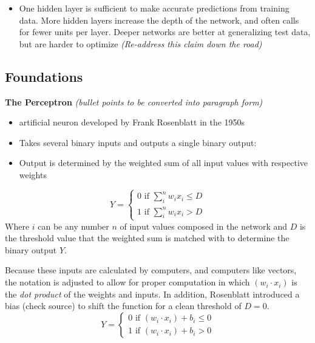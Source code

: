 \begin{itemize}
\tightlist
  
\item
  One hidden layer is sufficient to make accurate predictions from
  training data. More hidden layers increase the depth of the network,
  and often calls for fewer units per layer. Deeper networks are better
  at generalizing test data, but are harder to optimize
  \cite{Goodfellow-et-al-2016} \emph{(Re-address this claim down the
  road)}
\end{itemize}

\hypertarget{foundations}{%
\subsection{Foundations}\label{foundations}}

\textbf{The Perceptron} \textit{(bullet points to be converted into paragraph form)}

\begin{itemize}
\tightlist
\item
  artificial neuron developed by Frank Rosenblatt in the 1950s
  \cite{nielsen}
\item
  Takes several binary inputs and outputs a single binary output:
\item
  Output is determined by the weighted sum of all input values with
  respective weights
\end{itemize}

\[
Y = 
\begin{cases}
0 \text{ if } \sum_i^n w_ix_i \le D \\
1 \text{ if } \sum_i^n w_ix_i > D
\end{cases}
\] Where \(i\) can be any number \(n\) of input values composed in the
network and \(D\) is the threshold value that the weighted sum is
matched with to determine the binary output \(Y\).

Because these inputs are calculated by computers, and computers like
vectors, the notation is adjusted to allow for proper computation in which $(w_i \cdot x_i)$ is the \textit{dot product} of the weights and inputs. In
addition, Rosenblatt introduced a bias (check source) to shift the
function for a clean threshold of \(D = 0\). \[
Y = 
\begin{cases}
0 \text{ if } (w_i \cdot x_i) + b_i \le 0 \\
1 \text{ if } (w_i \cdot x_i) + b_i > 0
\end{cases}
\]

